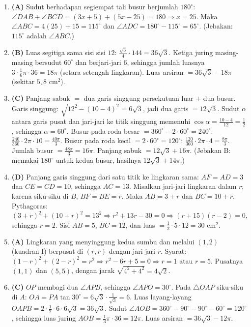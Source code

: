 \documentclass[a4paper,11pt]{article}
\newcommand{\dis}{\displaystyle}
\begin{document}
\begin{enumerate}[leftmargin=2em,itemsep=2pt,topsep=2pt]
\item[\textbf{10.}] \textbf{(A)} Sudut berhadapan segiempat tali busur berjumlah $180^\circ$: $\angle DAB+\angle BCD=(3x+5)+(5x-25)=180\Rightarrow x=25$. Maka $\angle ABC=4(25)+15=115^\circ$ dan $\angle ADC=180^\circ-115^\circ=65^\circ$. (Jebakan: $115^\circ$ adalah $\angle ABC$.)
\item[\textbf{11.}] \textbf{(B)} Luas segitiga sama sisi sisi $12$: $\frac{\sqrt3}{4}\cdot144=36\sqrt3$. Ketiga juring masing-masing bersudut $60^\circ$ dan berjari-jari $6$, sehingga jumlah luasnya $3\cdot\frac16\pi\cdot36=18\pi$ (setara setengah lingkaran). Luas arsiran $=36\sqrt3-18\pi$ (sekitar $5{,}8$ cm$^2$).
\item[\textbf{12.}] \textbf{(C)} Panjang sabuk $=$ dua garis singgung persekutuan luar $+$ dua busur. Garis singgung: $\sqrt{12^2-(10-4)^2}=6\sqrt3$, jadi dua garis $=12\sqrt3$. Sudut $\alpha$ antara garis pusat dan jari-jari ke titik singgung memenuhi $\cos\alpha=\dis\frac{10-4}{12}=\frac12$, sehingga $\alpha=60^\circ$. Busur pada roda besar $=360^\circ-2\cdot60^\circ=240^\circ$: $\frac{240}{360}\cdot2\pi\cdot10=\frac{40\pi}{3}$. Busur pada roda kecil $=2\cdot60^\circ=120^\circ$: $\frac{120}{360}\cdot2\pi\cdot4=\frac{8\pi}{3}$. Jumlah busur $=\frac{48\pi}{3}=16\pi$. Panjang sabuk $=12\sqrt3+16\pi$. (Jebakan B: memakai $180^\circ$ untuk kedua busur, hasilnya $12\sqrt3+14\pi$.)
\item[\textbf{13.}] \textbf{(D)} Panjang garis singgung dari satu titik ke lingkaran sama: $AF=AD=3$ dan $CE=CD=10$, sehingga $AC=13$. Misalkan jari-jari lingkaran dalam $r$; karena siku-siku di $B$, $BF=BE=r$. Maka $AB=3+r$ dan $BC=10+r$. Pythagoras: $(3+r)^2+(10+r)^2=13^2\Rightarrow r^2+13r-30=0\Rightarrow(r+15)(r-2)=0$, sehingga $r=2$. Sisi $AB=5$, $BC=12$, dan luas $=\frac12\cdot5\cdot12=30$ cm$^2$.
\item[\textbf{14.}] \textbf{(A)} Lingkaran yang menyinggung kedua sumbu dan melalui $(1,2)$ (kuadran I) berpusat di $(r,r)$ dengan jari-jari $r$. Syarat: $(1-r)^2+(2-r)^2=r^2\Rightarrow r^2-6r+5=0\Rightarrow r=1$ atau $r=5$. Pusatnya $(1,1)$ dan $(5,5)$, dengan jarak $\sqrt{4^2+4^2}=4\sqrt2$.
\item[\textbf{15.}] \textbf{(C)} $OP$ membagi dua $\angle APB$, sehingga $\angle APO=30^\circ$. Pada $\triangle OAP$ siku-siku di $A$: $OA=PA\tan30^\circ=6\sqrt3\cdot\frac{1}{\sqrt3}=6$. Luas layang-layang $OAPB=2\cdot\frac12\cdot6\cdot6\sqrt3=36\sqrt3$. Sudut $\angle AOB=360^\circ-90^\circ-90^\circ-60^\circ=120^\circ$, sehingga luas juring $AOB=\frac13\pi\cdot36=12\pi$. Luas arsiran $=36\sqrt3-12\pi$.

\end{enumerate}
\end{document}
